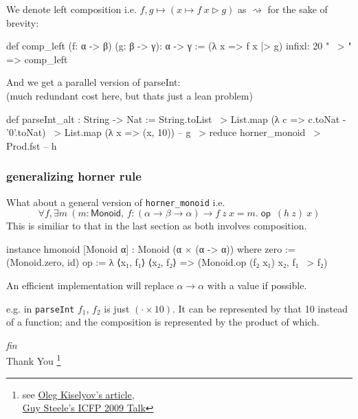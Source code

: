 \documentclass{beamer}
\newcommand\blfootnote[1]{%
  \begingroup
  \renewcommand\thefootnote{}\footnote{#1}%
  \addtocounter{footnote}{-1}%
  \endgroup
}
\DeclareMathOperator{\op}{\mathsf{op}}
\begin{document}
\begin{frame}[fragile]
    We denote left composition i.e. $f,g\mapsto (x\mapsto f\ x \rhd g)$ as $\rightsquigarrow$ for the sake of brevity:
\begin{leancode}
    def comp_left (f: α -> β) (g: β -> γ): α -> γ := (λ x => f x |> g)
    infixl: 20 " ~> " => comp_left
\end{leancode}
    And we get a parallel version of parseInt:\\
    (much redundant cost here, but thats just a lean problem)
    \begin{leancode}
        def parseInt_alt : String -> Nat :=
            String.toList
            ~> List.map (λ c => c.toNat - '0'.toNat)
            ~> List.map (λ x => (x, 10)) -- g
            ~> reduce horner_monoid
            ~> Prod.fst -- h
    \end{leancode}
\end{frame}
\begin{frame}[fragile]
    \frametitle{generalizing horner rule}
    What about a general version of \texttt{horner\_monoid} i.e.
    \[
        \forall f,\exists m\ (m: \mathsf{Monoid},\,f: (\alpha\to\beta\to\alpha)\to f\ z\ x = m.\op\ (h\ z)\ x)
    \]
    This is similiar to that in the last section as both involves composition.
\begin{leancode}
    instance hmonoid [Monoid α] : Monoid (α × (α -> α)) where
        zero := (Monoid.zero, id)
        op :=
            λ ⟨x₁, f₁⟩ ⟨x₂, f₂⟩ =>
                (Monoid.op (f₂ x₁) x₂, f₁ ~> f₂)
\end{leancode}
    An efficient implementation will replace $\alpha\to\alpha$ with a value if possible.

    e.g. in \texttt{parseInt} $f_1$, $f_2$ is just $(\cdot \times 10)$. It can be represented by that 10 instead of a function; and the composition is represented by the product of which.
\end{frame}
\begin{frame}{}
    \centering \Huge
    \emph{fin}\\
    \vspace{1.5cm}
    \huge{Thank You}
    \blfootnote{see \href{https://okmij.org/ftp/Algorithms/map-monoid-reduce.html}{Oleg Kiselyov's article},\\
     \quad\hphantom{Gsee }\href{https://web.archive.org/web/20091229162537/http://research.sun.com/projects/plrg/Publications/ICFPAugust2009Steele.pdf}{Guy Steele's ICFP 2009 Talk}}
\end{frame}
\end{document}
